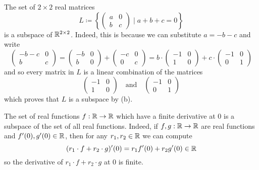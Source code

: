 \begin{example}{}{}
 The set of $2 \times 2$ real matrices
 \[
  L \coloneqq \left\{ 
   \begin{pmatrix}
    a & 0 \\
    b & c
   \end{pmatrix} \mid a + b + c = 0
  \right\}
 \]
 is a subspace of $\mathbb{R}^{2 \times 2}$. Indeed, this is because we can substitute
 $a = -b-c$ and write
 \[
  \begin{pmatrix}
   -b-c & 0\\
   b & c
  \end{pmatrix}
  =
  \begin{pmatrix}
   -b & 0\\
   b & 0
  \end{pmatrix}
  + 
  \begin{pmatrix}
   -c & 0\\
   0 & c
  \end{pmatrix}
  = 
  b \cdot
  \begin{pmatrix}
   -1 & 0\\
   1 & 0
  \end{pmatrix}
  + 
  c \cdot 
  \begin{pmatrix}
   -1 & 0\\
   0 & 1
  \end{pmatrix}
 \]
 and so every matrix in $L$ is a linear combination of the matrices
 \[
  \begin{pmatrix}
   -1 & 0\\
   1 & 0
  \end{pmatrix}
  \quad \text{and} \quad 
  \begin{pmatrix}
   -1 & 0\\
   0 & 1
  \end{pmatrix}
 \]
 which proves that $L$ is a subspace by
  (b).
\end{example}

\begin{example}{}{}
 The set of real functions $f:\mathbb{R} \to \mathbb{R}$ which have a finite derivative at $0$
 is a subspace of the set of all real functions. Indeed, if $f,g:\mathbb{R} \to \mathbb{R}$ are
 real functions and $f'(0), g'(0) \in \mathbb{R}$, then for any $r_1,r_2 \in \mathbb{R}$ we
 can compute
 \[
  (r_1 \cdot f + r_2 \cdot g)'(0) = r_1f'(0) + r_2g'(0) \in \mathbb{R}
 \]
 so the derivative of $r_1 \cdot f + r_2 \cdot g$ at $0$ is finite.
\end{example}

